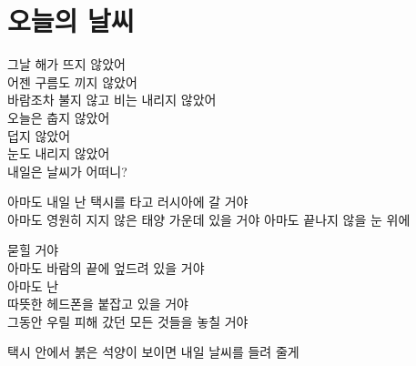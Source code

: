 \hypertarget{uxc624uxb298uxc758-uxb0a0uxc528}{%

\section{오늘의 날씨}\label{uxc624uxb298uxc758-uxb0a0uxc528}}



그날 해가 뜨지 않았어\\

어젠 구름도 끼지 않았어\\

바람조차 불지 않고 비는 내리지 않았어\\

오늘은 춥지 않았어\\

덥지 않았어\\

눈도 내리지 않았어\\

내일은 날씨가 어떠니?



아마도 내일 난 택시를 타고 러시아에 갈 거야\\

아마도 영원히 지지 않은 태양 가운데 있을 거야 아마도 끝나지 않을 눈 위에

묻힐 거야\\

아마도 바람의 끝에 엎드려 있을 거야\\

아마도 난\\

따뜻한 헤드폰을 붙잡고 있을 거야\\

그동안 우릴 피해 갔던 모든 것들을 놓칠 거야



택시 안에서 붉은 석양이 보이면 내일 날씨를 들려 줄게

